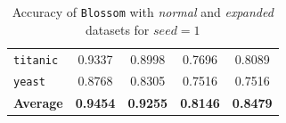 \documentclass[12pt]{report}
\theoremstyle{definition}
\theoremstyle{definition}
\theoremstyle{definition}
\begin{document}
\begin{table}[ht]
\begin{tabular}{lcccc}
    \multicolumn{1}{l}{\tt titanic}       & \multicolumn{1}{c}{0.9337} & \multicolumn{1}{c}{0.8998} & \multicolumn{1}{c}{0.7696} & \multicolumn{1}{c}{0.8089} \\
    \multicolumn{1}{l}{\tt yeast}         & \multicolumn{1}{c}{0.8768} & \multicolumn{1}{c}{0.8305} & \multicolumn{1}{c}{0.7516} & \multicolumn{1}{c}{0.7516} \\
    \hline
    \multicolumn{1}{l}{\bf Average}       & \multicolumn{1}{c}{\bf 0.9454} & \multicolumn{1}{c}{\bf 0.9255} & \multicolumn{1}{c}{\bf 0.8146} & \multicolumn{1}{c}{\bf 0.8479} \\
    \hline
    \end{tabular}
    \caption{Accuracy of \texttt{Blossom} with \textit{normal} and \textit{expanded} datasets for $seed=1$}
    \label{fig:seed1}
\end{table}
\end{document}

